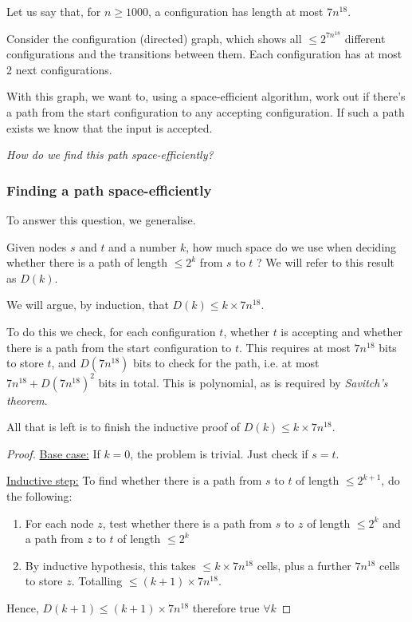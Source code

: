 \documentclass{article}
\begin{document}
Let us say that, for $n \geq 1000$, a configuration has length at most $7n^{18}$.

Consider the configuration (directed) graph, which shows all $\leq 2^{7n^{18}}$ different configurations and the transitions between them. Each configuration has at most 2 next configurations.

With this graph, we want to, using a space-efficient algorithm, work out if there's a path from the start configuration to any accepting configuration. If such a path exists we know that the input is accepted.

\textit{How do we find this path space-efficiently?}


\subsubsection{Finding a path space-efficiently}

To answer this question, we generalise.

Given nodes $s$ and $t$ and a number $k$, how much space do we use when deciding whether there is a path of length $\leq 2^{k}$ from $s$ to $t$ ? We will refer to this result as $D(k)$.

We will argue, by induction, that $D(k) \leq k \times 7n^{18}$.

To do this we check, for each configuration $t$, whether $t$ is accepting and whether there is a path from the start configuration to $t$. This requires at most $7n^{18}$ bits to store $t$, and $D(7n^{18})$ bits to check for the path, i.e. at most $7n^{18} +  D(7n^{18})^{2}$ bits in total. This is polynomial, as is required by \textit{Savitch's theorem}.

All that is left is to finish the inductive proof of $D(k) \leq k \times 7n^{18}$.
\begin{proof}

\underline{Base case:} If $k=0$, the problem is trivial. Just check if $s=t$.

\underline{Inductive step:} To find whether there is a path from $s$ to $t$ of length $\leq 2^{k+1}$, do the following:
\begin{enumerate}
  \item For each node $z$, test whether there is a path from $s$ to $z$ of length $\leq 2^{k}$ and a path from $z$ to $t$ of length $\leq 2^{k}$
  \item By inductive hypothesis, this takes $\leq k \times 7n^{18}$ cells, plus a further $7n^{18}$ cells to store $z$. Totalling $\leq (k+1) \times 7n^{18}$.

\end{enumerate}

Hence, $D(k+1) \leq (k+1) \times 7n^{18}$ therefore true $\forall k$
\end{proof}
\end{document}
